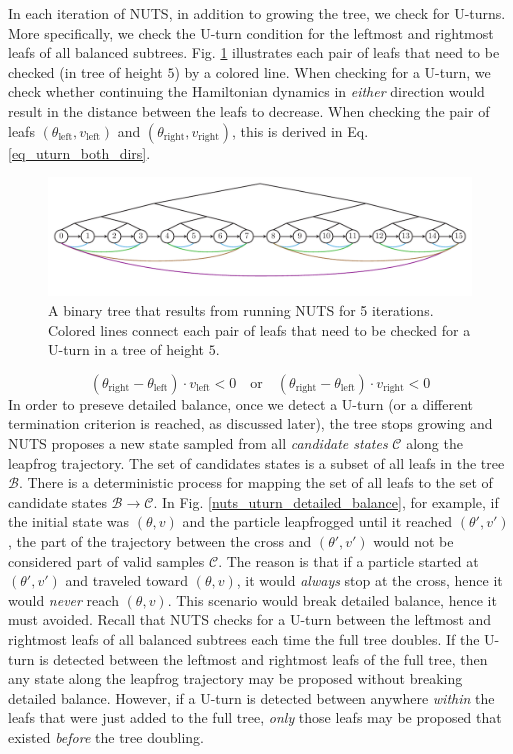 \documentclass[12pt]{article}
\begin{document}
In each iteration of NUTS, in addition to growing the tree, we check for U-turns. More specifically, we check the U-turn condition for the leftmost and rightmost leafs of all balanced subtrees. Fig. \ref{fig_nuts_uturn_leafs} illustrates each pair of leafs that need to be checked (in tree of height $5$) by a colored line. When checking for a U-turn, we check whether continuing the Hamiltonian dynamics in \textit{either} direction would result in the distance between the leafs to decrease. When checking the pair of leafs $(\theta_\text{left}, v_\text{left})$ and $(\theta_\text{right}, v_\text{right})$, this is derived in Eq. \ref{eq_uturn_both_dirs}.

\begin{figure}[h]
\centering
\includegraphics[width=14cm]{illustrations/nuts_uturn_leafs.pdf}
\caption{A binary tree that results from running NUTS for 5 iterations. Colored  lines connect each pair of leafs that need to be checked for a U-turn in a tree of height $5$.}
\label{fig_nuts_uturn_leafs}
\end{figure}

$$
(\theta_\text{right} - \theta_\text{left}) \cdot v_\text{left} < 0
\quad \text{or} \quad
(\theta_\text{right} - \theta_\text{left}) \cdot v_\text{right} < 0
\label{eq_uturn_both_dirs}
$$
In order to preseve detailed balance, once we detect a U-turn (or a different termination criterion is reached, as discussed later), the tree stops growing and NUTS proposes a new state sampled from all \textit{candidate states} $\mathcal{C}$ along the leapfrog trajectory. The set of candidates states is a subset of all leafs in the tree $\mathcal{B}$. There is a deterministic process for mapping the set of all leafs to the set of candidate states $\mathcal{B} \rightarrow \mathcal{C}$. In Fig. \ref{nuts_uturn_detailed_balance}, for example, if the initial state was $(\theta, v)$ and the particle leapfrogged until it reached $(\theta', v')$, the part of the trajectory between the cross and $(\theta', v')$ would not be considered part of valid samples $\mathcal{C}$. The reason is that if a particle started at $(\theta', v')$ and traveled toward $(\theta, v)$, it would \textit{always} stop at the cross, hence it would \textit{never} reach $(\theta, v)$. This scenario would break detailed balance, hence it must avoided. Recall that NUTS checks for a U-turn between the leftmost and rightmost leafs of all balanced subtrees each time the full tree doubles. If the U-turn is detected between the leftmost and rightmost leafs of the full tree, then any state along the leapfrog trajectory may be proposed without breaking detailed balance. However, if a U-turn is detected between anywhere \textit{within} the leafs that were just added to the full tree, \textit{only} those leafs may be proposed that existed \textit{before} the tree doubling.
\end{document}
